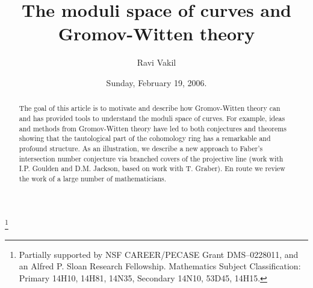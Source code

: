 \documentclass[12pt,letterpaper]{amsart}
\begin{document}
\pagestyle{plain}
\title{{\large {The moduli space of curves and Gromov-Witten theory}}
}
\author{Ravi Vakil}
\address{Dept. of Mathematics, Stanford University, Stanford CA~94305--2125}
\thanks{Partially supported by NSF CAREER/PECASE Grant DMS--0228011, and 
an Alfred P. Sloan Research Fellowship.
\newline
{} 
Mathematics Subject Classification:  Primary 
14H10, 14H81, 14N35,
Secondary  14N10, 53D45, 14H15.
}
\date{Sunday, February 19, 2006.}
\begin{abstract}
  The goal of this article is to motivate and describe how
  Gromov-Witten theory can and has provided tools to understand
  the moduli space of curves.  For example, ideas and methods from
  Gromov-Witten theory have led to both conjectures and theorems
  showing that the tautological part of the cohomology ring has a
  remarkable and profound structure.  As an illustration, we describe
  a new approach to Faber's intersection number conjecture via
  branched covers of the projective line (work with I.P. Goulden and
  D.M. Jackson, based on work with T.  Graber).  En route we 
  review the work of a large number of mathematicians.
\end{abstract}
\maketitle
\tableofcontents
\end{document}
